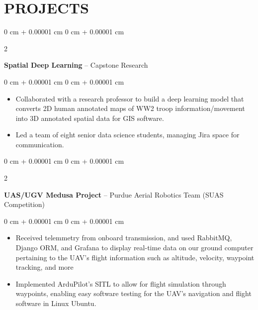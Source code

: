 \documentclass[10pt, letterpaper]{article}
\newenvironment{highlights}{
    \begin{itemize}[
        topsep=0.10 cm,
        parsep=0.10 cm,
        partopsep=0pt,
        itemsep=0pt,
        leftmargin=0 cm + 10pt
    ]
}{
    \end{itemize}
} %
\newenvironment{onecolentry}{
    \begin{adjustwidth}{
        0 cm + 0.00001 cm
    }{
        0 cm + 0.00001 cm
    }
}{
    \end{adjustwidth}
} %
\newenvironment{twocolentry}[2][]{
    \onecolentry
    \def\secondColumn{#2}
    \setcolumnwidth{\fill, 4.5 cm}
    \begin{paracol}{2}
}{
    \switchcolumn \raggedleft \secondColumn
    \end{paracol}
    \endonecolentry
} %
\begin{document}
    
    \section{PROJECTS}

        \begin{twocolentry}{
        }
            \textbf{Spatial Deep Learning} -- Capstone Research\end{twocolentry}

        \vspace{0.10 cm}
        \begin{onecolentry}
            \begin{highlights}
                \item Collaborated with a research professor to build a deep learning model that converts 2D human annotated maps of WW2 troop information/movement into 3D annotated spatial data for GIS software.
                \item Led a team of eight senior data science students, managing Jira space for communication.
            \end{highlights}
        \end{onecolentry}

        \vspace{0.2 cm}



        
        \begin{twocolentry}{
        }
            \textbf{UAS/UGV Medusa Project} -- Purdue Aerial Robotics Team (SUAS Competition)\end{twocolentry}

        \vspace{0.10 cm}
        \begin{onecolentry}
            \begin{highlights}
                \item Received telemmetry from onboard transmission, and used RabbitMQ, Django ORM, and Grafana to display real-time data on our ground computer pertaining to the UAV's flight information such as altitude, velocity, waypoint tracking, and more
                \item Implemented ArduPilot's SITL to allow for flight simulation through waypoints, enabling easy software testing for the UAV's navigation and flight software in Linux Ubuntu.
            \end{highlights}
        \end{onecolentry}
\end{document}

